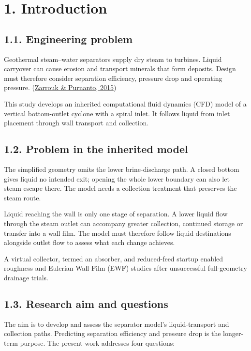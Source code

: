\documentclass[
  12pt,
  a4paper,
]{article}
\author{}
\date{}
\begin{document}
\section{1. Introduction}\label{introduction}

\subsection{1.1. Engineering problem}\label{engineering-problem}

Geothermal steam--water separators supply dry steam to turbines. Liquid
carryover can cause erosion and transport minerals that form deposits.
Design must therefore consider separation efficiency, pressure drop and
operating pressure.
(\href{https://doi.org/10.1016/j.geothermics.2014.05.009}{Zarrouk \&
Purnanto, 2015})

This study develops an inherited computational fluid dynamics (CFD)
model of a vertical bottom-outlet cyclone with a spiral inlet. It
follows liquid from inlet placement through wall transport and
collection.

\subsection{1.2. Problem in the inherited
model}\label{problem-in-the-inherited-model}

The simplified geometry omits the lower brine-discharge path. A closed
bottom gives liquid no intended exit; opening the whole lower boundary
can also let steam escape there. The model needs a collection treatment
that preserves the steam route.

Liquid reaching the wall is only one stage of separation. A lower liquid
flow through the steam outlet can accompany greater collection,
continued storage or transfer into a wall film. The model must therefore
follow liquid destinations alongside outlet flow to assess what each
change achieves.

A virtual collector, termed an absorber, and reduced-feed startup
enabled roughness and Eulerian Wall Film (EWF) studies after
unsuccessful full-geometry drainage trials.

\subsection{1.3. Research aim and
questions}\label{research-aim-and-questions}

The aim is to develop and assess the separator model's liquid-transport
and collection paths. Predicting separation efficiency and pressure drop
is the longer-term purpose. The present work addresses four questions:
\end{document}
